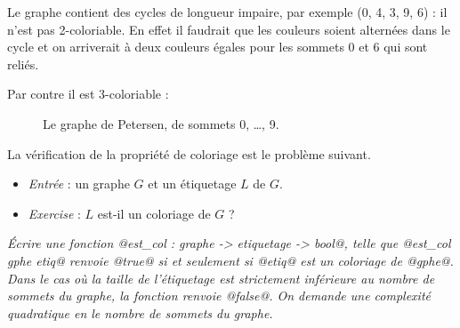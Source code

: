 \begin{Answer}
Le graphe contient des cycles de longueur impaire, par exemple (0, 4, 3, 9, 6) : il n'est pas 2-coloriable. En effet il faudrait que les couleurs soient alternées dans le cycle et on arriverait à deux couleurs égales pour les sommets 0 et 6 qui sont reliés.

Par contre il est 3-coloriable :

\begin{center}
\end{center}
\end{Answer}
\begin{figure}[h]
\centering
{} 
\caption{\label{fig:2:petersen} Le graphe de Petersen, de sommets 0, \dots, 9.}
\end{figure}
La vérification de la propriété de coloriage est le problème suivant.
\begin{itemize} 
    \item \emph{Entrée} : un graphe $G$ et un étiquetage $L$ de $G$. 
    \item \emph{Exercise}  : $L$ est-il un coloriage de $G$ ? 
\end{itemize}
\begin{Exercise} \it
Écrire une fonction @est_col : graphe -> etiquetage -> bool@, telle que @est_col gphe etiq@ renvoie @true@ si et seulement si @etiq@ est un coloriage de @gphe@. Dans le cas où la taille de l'étiquetage est strictement inférieure au nombre de sommets du graphe, la fonction renvoie @false@. On demande une complexité quadratique en le nombre de sommets du graphe. 
\end{Exercise}  
